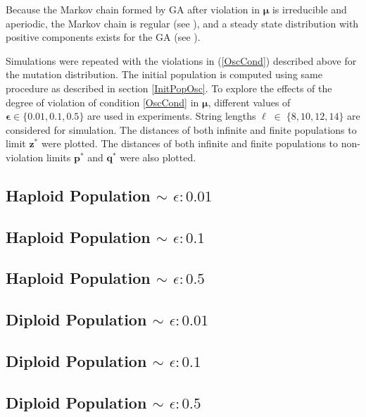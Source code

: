 Because the Markov chain formed by GA after violation in $\bm{\mu}$ is irreducible and aperiodic, 
the Markov chain is regular (see \cite{Iosifescu1980}), and a steady state distribution 
with positive components exists for the GA (see \cite{Minc1988}).   

Simulations were repeated with the violations in (\ref{OscCond}) described above for the mutation distribution. 
The initial population is 
computed using same procedure as described in section \ref{InitPopOsc}. To explore the effects of the degree  
of violation of condition \ref{OscCond} in $\bm{\mu}$, different values of $\bm{\epsilon} \in \{0.01, 0.1, 0.5\} $ are used in experiments. 
String lengths $\ell \;\in\; \{8, 10, 12, 14\}$ are considered for simulation.
The distances of both infinite and finite populations to limit $\bm{z}^\ast$ were plotted. 
The distances of both infinite and finite populations to non-violation limits $\bm{p}^\ast$ and $\bm{q}^\ast$ were also plotted.

\subsection{Haploid Population $\mathtt{\sim}$ $\epsilon: 0.01$}

\subsection{Haploid Population $\mathtt{\sim}$ $\epsilon: 0.1$}

\subsection{Haploid Population $\mathtt{\sim}$ $\epsilon: 0.5$}

\clearpage
\subsection{Diploid Population $\mathtt{\sim}$ $\epsilon: 0.01$}

\subsection{Diploid Population $\mathtt{\sim}$ $\epsilon: 0.1$}

\subsection{Diploid Population $\mathtt{\sim}$ $\epsilon: 0.5$}


